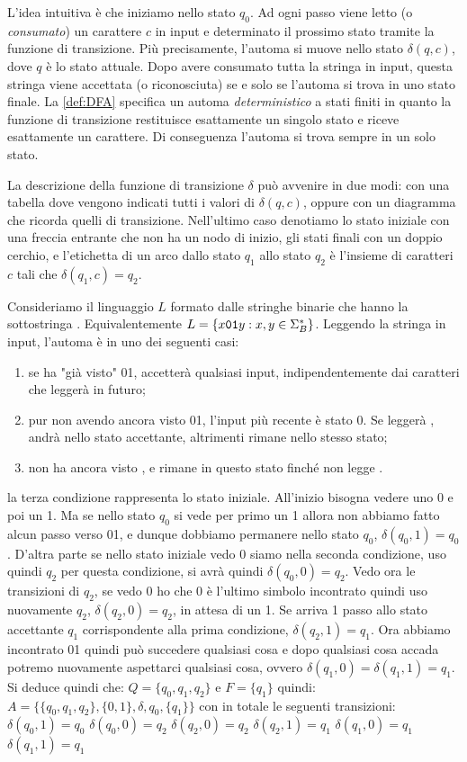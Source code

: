 L'idea intuitiva è che iniziamo nello stato $q_{0}$.
Ad ogni passo viene letto (o \emph{consumato}) un carattere $c$ in input e determinato il prossimo stato tramite la
funzione di transizione.
Più precisamente, l'automa si muove nello stato $\delta(q,c)$, dove $q$ è lo stato attuale.
Dopo avere consumato tutta la stringa in input, questa stringa viene accettata (o riconosciuta) se e solo se l'automa si
trova in uno stato finale.
La \ref{def:DFA} specifica un automa \emph{deterministico} a stati finiti in quanto la funzione di transizione
restituisce esattamente un singolo stato e riceve esattamente un carattere.
Di conseguenza l'automa si trova sempre in un solo stato.

La descrizione della funzione di transizione $\delta$ può avvenire in due modi: con una tabella dove vengono indicati
tutti i valori di $\delta(q,c)$, oppure con un diagramma che ricorda quelli di transizione.
Nell'ultimo caso denotiamo lo stato iniziale con una freccia entrante che non ha un nodo di inizio, gli stati finali con
un doppio cerchio, e l'etichetta di un arco dallo stato $q_1$ allo stato $q_2$ è l'insieme di caratteri $c$ tali che
$\delta(q_1, c) = q_2 $.
\begin{example}
	Consideriamo il linguaggio $L$ formato dalle stringhe binarie che hanno la sottostringa \zero\uno.
	Equivalentemente $L=\{ x\mathtt{0}\mathtt{1} y: x,y \in \Sigma_{B}^{*}\}$.
	Leggendo la stringa in input, l'automa è in uno dei seguenti casi:
	\begin{enumerate}
		\item se ha "già visto" 01, accetterà qualsiasi input, indipendentemente dai caratteri che leggerà in futuro;
		\item pur non avendo ancora visto 01, l'input più recente è stato 0.
		      Se leggerà \uno, andrà nello stato accettante, altrimenti rimane nello stesso stato;
		\item non ha ancora visto \zero, e rimane in questo stato finché non legge \zero.
	\end{enumerate}
	la terza condizione rappresenta lo stato iniziale. All'inizio bisogna vedere uno 0 e poi un 1. Ma se nello stato $q_0$ si vede per primo un 1 allora non abbiamo fatto alcun passo verso 01, e dunque dobbiamo permanere nello stato $q_0$, $\delta(q_0,1)=q_0$. D'altra parte se nello stato iniziale vedo 0 siamo nella seconda condizione, uso quindi $q_2$ per questa condizione, si avrà quindi $\delta(q_0,0)=q_2$. Vedo ora le transizioni di $q_2$, se vedo 0 ho che 0 è l'ultimo simbolo incontrato quindi uso nuovamente $q_2$, $\delta(q_2,0)=q_2$, in attesa di un 1. Se arriva 1 passo allo stato accettante $q_1$ corrispondente alla prima condizione, $\delta(q_2,1)=q_1$. Ora abbiamo incontrato 01 quindi può succedere qualsiasi cosa e dopo qualsiasi cosa accada potremo nuovamente aspettarci qualsiasi cosa, ovvero $\delta(q_1,0)=\delta(q_1,1)=q_1$. Si deduce quindi che:
	$Q=\{q_0,q_1,q_2\} \text{ e } F=\{q_1\}$
	quindi:
	$A=\{\{q_0,q_1,q_2\} ,\{0,1\}, \delta, q_0, \{q_1\} \}$
	con in totale le seguenti transizioni:
	$\delta(q_0,1)=q_0$
	$\delta(q_0,0)=q_2$
	$\delta(q_2,0)=q_2$
	$\delta(q_2,1)=q_1$
	$\delta(q_1,0)=q_1$
	$\delta(q_1,1)=q_1$
\end{example}

